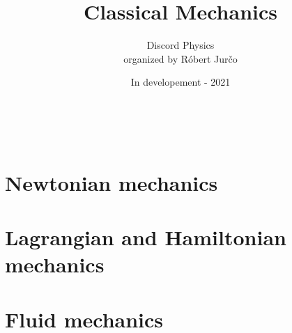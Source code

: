 \documentclass[10pt,a4paper]{article}
\title{Classical Mechanics}
\author{Discord Physics \\ organized by R\'{o}bert Jur\v{c}o}
\date{In developement - 2021}
\newcounter{numchapter}
\begin{document}
\maketitle
~\newpage
\tableofcontents
~\newpage

\part{Newtonian mechanics}


\part{Lagrangian and Hamiltonian mechanics}

\part{Fluid mechanics}
\end{document}
